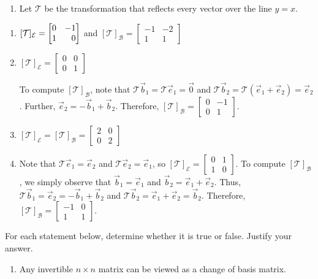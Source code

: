 \begin{exercises}
\begin{problist}
\begin{enumerate}
			\item Let $\mathcal T$ be the transformation that reflects
				every vector over the line $y=x$.
		\end{enumerate}
		\begin{solution}
			\begin{enumerate}
				\item 
					$[\mathcal T]_{\mathcal E}=\mat{0&-1\\1&0}$ and $[\mathcal T]_{\mathcal B}=
				\begin{bmatrix}
				-1 & -2 \\ 1 & 1
				\end{bmatrix}$
				\item 
				$[\mathcal T]_{\mathcal E}=
				\begin{bmatrix}
					0 & 0 \\ 0 & 1
				\end{bmatrix}$
				
				To compute $[\mathcal T]_{\mathcal B}$, note that $\mathcal T\vec b_1=\mathcal T\vec e_1=\vec 0$
				and $\mathcal T\vec b_2=\mathcal T(\vec e_1+\vec e_2)=\vec e_2$. Further,
				$\vec e_2=-\vec b_1+\vec b_2$. Therefore, 
				$[\mathcal T]_{\mathcal B}=
				\begin{bmatrix}
					0 & -1 \\ 0 & 1
				\end{bmatrix}$.
				\item 
				$[\mathcal T]_{\mathcal E}=[\mathcal T]_{\mathcal B}=
				\begin{bmatrix}
					2 & 0 \\ 0 & 2
				\end{bmatrix}$
				\item Note that $\mathcal T\vec e_1=\vec e_2$ and $\mathcal T\vec e_2=\vec e_1$, so
				$[\mathcal T]_{\mathcal E}=
				\begin{bmatrix}
					0 & 1 \\ 1 & 0
				\end{bmatrix}$.
				To compute $[\mathcal T]_{\mathcal B}$, we simply observe that $\vec b_1=\vec e_1$
				and $\vec b_2=\vec e_1+\vec e_2$. Thus, $\mathcal T\vec b_1=\vec e_2=-\vec b_1+\vec b_2$
				and $\mathcal T\vec b_2=\vec e_1+\vec e_2=\vec b_2$. Therefore, 
				$[\mathcal T]_{\mathcal B}=
				\begin{bmatrix}
					-1 & 0 \\ 1 & 1
				\end{bmatrix}$.
			\end{enumerate}
		\end{solution}
		\prob For each statement below, determine whether it is true or false. Justify your answer.
		\begin{enumerate}
			\item Any invertible $n \times n$ matrix can be viewed as
				a change of basis matrix.


\end{enumerate}
\end{problist}
\end{exercises}
